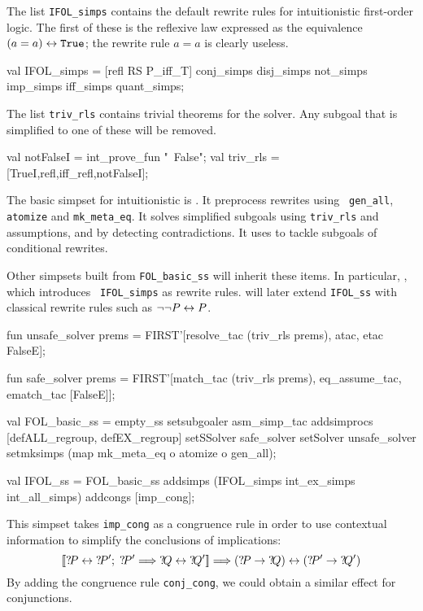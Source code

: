 The list \texttt{IFOL_simps} contains the default rewrite rules for
intuitionistic first-order logic.  The first of these is the reflexive law
expressed as the equivalence $(a=a)\leftrightarrow\texttt{True}$; the rewrite rule $a=a$ is
clearly useless.
\begin{ttbox}
val IFOL_simps =
   [refl RS P_iff_T] \at conj_simps \at disj_simps \at not_simps \at 
    imp_simps \at iff_simps \at quant_simps;
\end{ttbox}
The list \texttt{triv_rls} contains trivial theorems for the solver.  Any
subgoal that is simplified to one of these will be removed.
\begin{ttbox}
val notFalseI = int_prove_fun "~False";
val triv_rls = [TrueI,refl,iff_refl,notFalseI];
\end{ttbox}
%
The basic simpset for intuitionistic \FOL{} is
.  It preprocess rewrites using {\tt
  gen_all}, \texttt{atomize} and \texttt{mk_meta_eq}.  It solves simplified
subgoals using \texttt{triv_rls} and assumptions, and by detecting
contradictions.  It uses  to tackle subgoals of
conditional rewrites.

Other simpsets built from \texttt{FOL_basic_ss} will inherit these items.
In particular, , which introduces {\tt
  IFOL_simps} as rewrite rules.   will later
extend \texttt{IFOL_ss} with classical rewrite rules such as $\neg\neg
P\leftrightarrow P$.
\begin{ttbox}
fun unsafe_solver prems = FIRST'[resolve_tac (triv_rls {\at} prems),
                                 atac, etac FalseE];

fun   safe_solver prems = FIRST'[match_tac (triv_rls {\at} prems),
                                 eq_assume_tac, ematch_tac [FalseE]];

val FOL_basic_ss = empty_ss setsubgoaler asm_simp_tac
                            addsimprocs [defALL_regroup, defEX_regroup]
                            setSSolver   safe_solver
                            setSolver  unsafe_solver
                            setmksimps (map mk_meta_eq o 
                                        atomize o gen_all);

val IFOL_ss = FOL_basic_ss addsimps (IFOL_simps {\at} 
                                     int_ex_simps {\at} int_all_simps)
                           addcongs [imp_cong];
\end{ttbox}
This simpset takes \texttt{imp_cong} as a congruence rule in order to use
contextual information to simplify the conclusions of implications:
\[ \List{\Var{P}\bimp\Var{P'};\; \Var{P'} \Imp \Var{Q}\bimp\Var{Q'}} \Imp
   (\Var{P}\imp\Var{Q}) \bimp (\Var{P'}\imp\Var{Q'})
\]
By adding the congruence rule \texttt{conj_cong}, we could obtain a similar
effect for conjunctions.


